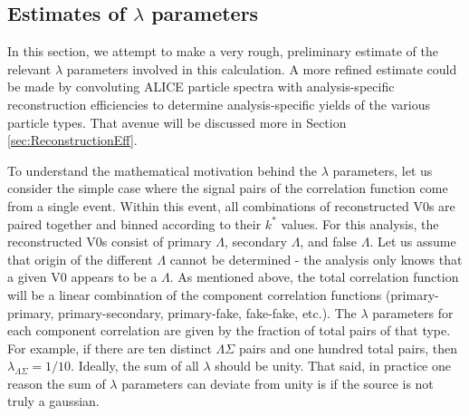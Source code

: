 
\subsection{Estimates of $\lambda$ parameters}
\label{sec:LambdaParams}

In this section, we attempt to make a very rough, preliminary estimate of the relevant $\lambda$ parameters involved in this calculation.  A more refined estimate could be made by convoluting ALICE particle spectra with analysis-specific reconstruction efficiencies to determine analysis-specific yields of the various particle types.  That avenue will be discussed more in Section \ref{sec:ReconstructionEff}. 

To understand the mathematical motivation behind the $\lambda$ parameters, let us consider the simple case where the signal pairs of the correlation function come from a single event.  Within this event, all combinations of reconstructed V0s are paired together and binned according to their $k^*$ values.  For this analysis, the reconstructed V0s consist of primary $\Lambda$, secondary $\Lambda$, and false $\Lambda$.  Let us assume that origin of the different $\Lambda$ cannot be determined - the analysis only knows that a given V0 appears to be a $\Lambda$.  As mentioned above, the total correlation function will be a linear combination of the component correlation functions (primary-primary, primary-secondary, primary-fake, fake-fake, etc.).  The $\lambda$ parameters for each component correlation are given by the fraction of total pairs of that type.  For example, if there are ten distinct $\Lambda\Sigma$ pairs and one hundred total pairs, then $\lambda_{\Lambda\Sigma} = 1/10$.  Ideally, the sum of all $\lambda$ should be unity.  That said, in practice one reason the sum of $\lambda$ parameters can deviate from unity is if the source is not truly a gaussian.

